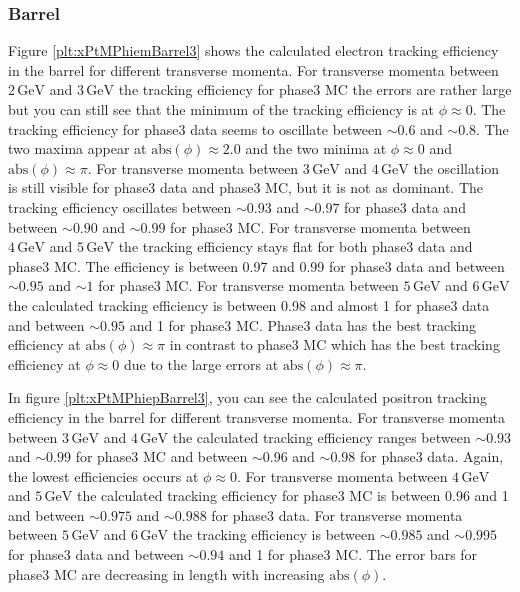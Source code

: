 \documentclass[a4paper,11pt,twosided,final,german,openbib,pdftex,listof=totoc,bibliography=totoc]{scrbook}
\begin{document}
\newpage
\subsubsection{Barrel}


Figure \ref{plt:xPtMPhiemBarrel3} shows the calculated electron tracking efficiency in the barrel for different transverse momenta.
For transverse momenta between $2\,\textrm{GeV}$ and $3\,\textrm{GeV}$ the tracking efficiency for phase3 MC the errors are rather large but you can still see that the minimum of the tracking efficiency is at $\phi \approx 0$. The tracking efficiency for phase3 data seems to oscillate between $\sim 0.6$ and $\sim 0.8$. The two maxima appear at $\textrm{abs}(\phi) \approx 2.0$ and the two minima at $\phi \approx 0$ and $\textrm{abs}(\phi) \approx \pi$.
For transverse momenta between $3\,\textrm{GeV}$ and $4\,\textrm{GeV}$ the oscillation is still visible for phase3 data and phase3 MC, but it is not as dominant. The tracking efficiency oscillates between $\sim 0.93$ and  $\sim 0.97$ for phase3 data and between $\sim 0.90$ and $\sim 0.99$ for phase3 MC.
For transverse momenta between $4\,\textrm{GeV}$ and $5\,\textrm{GeV}$ the tracking efficiency stays flat for both phase3 data and phase3 MC. The efficiency is between 0.97 and 0.99 for phase3 data and between $\sim 0.95$ and $\sim 1$ for phase3 MC.
For transverse momenta between $5\,\textrm{GeV}$ and $6\,\textrm{GeV}$ the calculated tracking efficiency is between 0.98 and almost 1 for phase3 data and between $\sim 0.95$ and 1 for phase3 MC. Phase3 data has the best tracking efficiency at $\textrm{abs}(\phi) \approx \pi$ in contrast to phase3 MC which has the best tracking efficiency at $\phi \approx 0$ due to the large errors at $\textrm{abs}(\phi) \approx \pi$. 

In figure \ref{plt:xPtMPhiepBarrel3}, you can see the calculated positron tracking efficiency in the barrel for different transverse momenta.
For transverse momenta between $3\,\textrm{GeV}$ and $4\,\textrm{GeV}$ the calculated tracking efficiency ranges between $\sim 0.93$ and $\sim 0.99$ for phase3 MC and between $\sim 0.96$ and $\sim 0.98$ for phase3 data. Again, the lowest efficiencies occurs at $\phi \approx 0$.
For transverse momenta between $4\,\textrm{GeV}$ and $5\,\textrm{GeV}$ the calculated tracking efficiency for phase3 MC is between 0.96 and 1 and between $\sim 0.975$ and $\sim 0.988$ for phase3 data. 
For transverse momenta between $5\,\textrm{GeV}$ and $6\,\textrm{GeV}$ the tracking efficiency is between $\sim 0.985$ and $\sim 0.995$ for phase3 data and between $\sim 0.94$ and 1 for phase3 MC. The error bars for phase3 MC are decreasing in length with increasing $\textrm{abs}(\phi)$.
\end{document}
